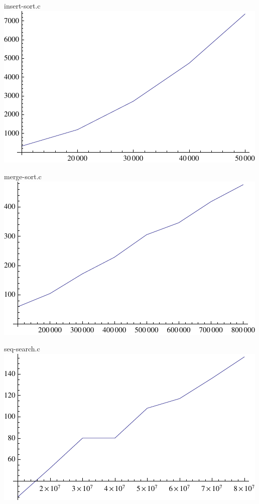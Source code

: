 \documentclass[letter]{article}
\begin{document}
insert-sort.c\\
\includegraphics[scale=1]{insert.pdf}

merge-sort.c\\
\includegraphics[scale=1]{mergesort.pdf}

seq-search.c\\
\includegraphics[scale=1]{seqsort.pdf}
\end{document}
